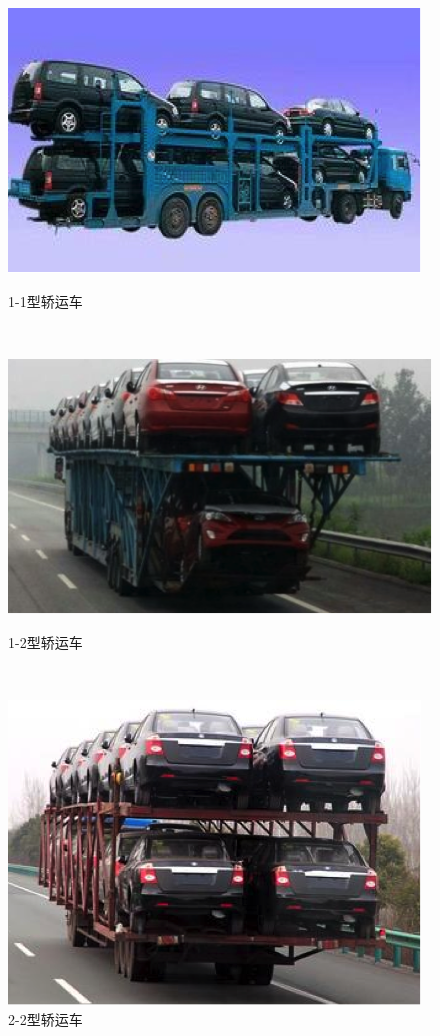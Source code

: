 \documentclass[UTF8，12pt]{ctexart}
\begin{document}
\begin{figure}[h!]
\begin{minipage}[t]{0.32\textwidth}
  \includegraphics[width=\linewidth]{figure/1-1.png}
  \caption{1-1型轿运车}
\end{minipage}
~
\begin{minipage}[t]{0.32\textwidth}
  \includegraphics[width=\linewidth]{figure/1-2.png}
  \caption{1-2型轿运车}
\end{minipage}
~
\begin{minipage}[t]{0.32\textwidth}
  \includegraphics[width=\linewidth]{figure/2-2.png}
  \caption{2-2型轿运车}
\end{minipage}
\end{figure}
\end{document}
